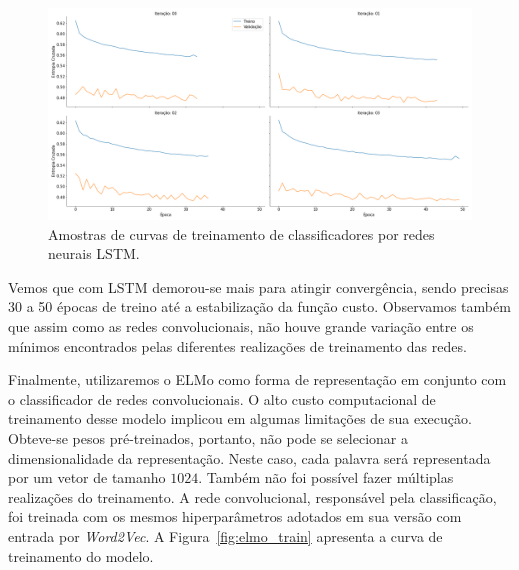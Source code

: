 \begin{figure}[h!]
\begin{center} {
    \begin{center}
    \includegraphics[scale=0.25]{images/lstm_train.png}
    \caption{Amostras de curvas de treinamento de classificadores por redes neurais LSTM.}
    \label{fig:lstm_train}
    \end{center}
}
\end{center}
\end{figure}

Vemos que com LSTM demorou-se mais para atingir convergência, sendo precisas
30 a 50 épocas de treino até a estabilização da função custo.
Observamos também que assim como as redes convolucionais, não houve grande
variação entre os mínimos encontrados pelas diferentes realizações de
treinamento das redes.

Finalmente, utilizaremos o ELMo como forma de representação em conjunto com o
classificador de redes convolucionais.
O alto custo computacional de treinamento desse modelo implicou em algumas
limitações de sua execução.
Obteve-se pesos pré-treinados, portanto, não pode se selecionar a
dimensionalidade da representação.
Neste caso, cada palavra será representada por um vetor de tamanho $1024$.
Também não foi possível fazer múltiplas realizações do treinamento.
A rede convolucional, responsável pela classificação, foi treinada com os mesmos
hiperparâmetros adotados em sua versão com entrada por \textit{Word2Vec}.
A Figura~\ref{fig:elmo_train} apresenta a curva de treinamento do modelo.



